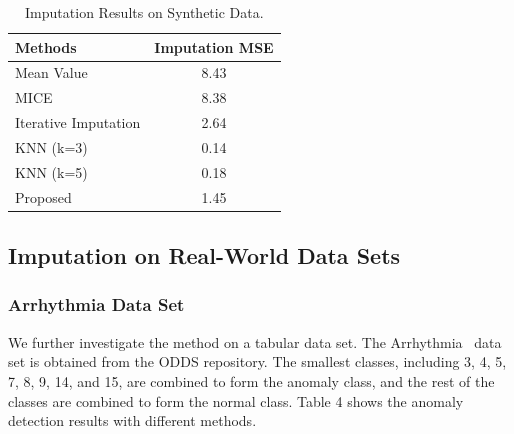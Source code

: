 \documentclass[conference]{IEEEtran}
\begin{document}
\begin{table}[t!]
\begin{center}
\caption{Imputation Results on Synthetic Data.} \label{tab:causality2}
\begin{tabular}{l | c  }\hline
Methods & Imputation MSE  \\
\hline
Mean Value &8.43 \\
\hline
MICE &8.38 \\
\hline
Iterative Imputation & 2.64 \\
\hline
KNN (k=3) &0.14 \\
\hline
KNN (k=5) &0.18 \\
\hline
Proposed &  1.45  \\  
\hline
\end{tabular}
\end{center}
\end{table}



\subsection{Imputation on Real-World Data Sets}

\subsubsection{Arrhythmia Data Set}
We further investigate the method on a tabular data set.  The Arrhythmia~\cite{Dua:2019}  data set is  obtained from the ODDS repository. The smallest classes, including 3, 4, 5, 7, 8, 9, 14, and 15, are combined to form the anomaly class, and the rest of the classes are combined to form the normal class. Table 4 shows the anomaly detection results with different methods. 


\end{document}
